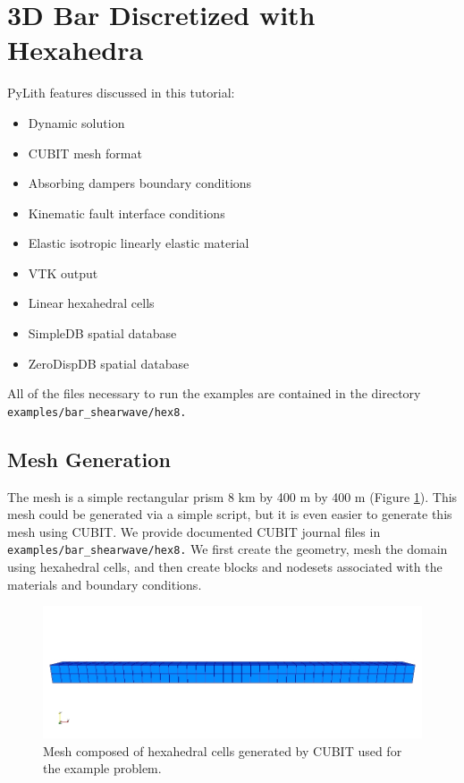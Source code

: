 
\section{\label{sec:tutorial:shearwave:hex8}3D Bar Discretized with Hexahedra}

PyLith features discussed in this tutorial:
\begin{itemize}
\item Dynamic solution
\item CUBIT mesh format
\item Absorbing dampers boundary conditions
\item Kinematic fault interface conditions
\item Elastic isotropic linearly elastic material
\item VTK output
\item Linear hexahedral cells
\item SimpleDB spatial database
\item ZeroDispDB spatial database
\end{itemize}
All of the files necessary to run the examples are contained in the
directory \texttt{examples/bar\_shearwave/hex8.}


\subsection{Mesh Generation}

The mesh is a simple rectangular prism 8 km by 400 m by 400 m (Figure
\ref{fig:shearwave:hex8:mesh}). This mesh could be generated via
a simple script, but it is even easier to generate this mesh using
CUBIT. We provide documented CUBIT journal files in \texttt{examples/bar\_shearwave/hex8.}
We first create the geometry, mesh the domain using hexahedral cells,
and then create blocks and nodesets associated with the materials
and boundary conditions.

\noindent \begin{center}
\begin{figure}
\begin{centering}
\includegraphics[scale=0.5]{tutorials/shearwave/figs/hex8mesh}
\par\end{centering}

\caption{Mesh composed of hexahedral cells generated by CUBIT used for the
example problem.\label{fig:shearwave:hex8:mesh}}
\end{figure}

\par\end{center}


